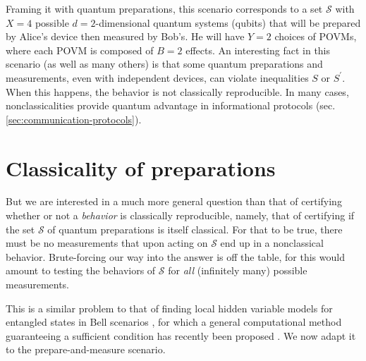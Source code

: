     Framing it with quantum preparations, this scenario corresponds to a set $\mathcal{S}$ with $X=4$ possible $d=2$-dimensional quantum systems (qubits) that will be prepared by Alice's device then measured by Bob's. He will have $Y=2$ choices of POVMs, where each POVM is composed of $B=2$ effects. An interesting fact in this scenario (as well as many others) is that some quantum preparations and measurements, even with independent devices, can violate inequalities $S$ or $S^\prime$. When this happens, the behavior is not classically reproducible. In many cases, nonclassicalities provide quantum advantage in informational protocols (sec. \ref{sec:communication-protocols}). 

    \section{Classicality of preparations}
    \label{sec:preparation-classicality}

        But we are interested in a much more general question than that of certifying whether or not a \emph{behavior} is classically reproducible, namely, that of certifying if the set $\mathcal{S}$ of quantum preparations is itself classical. For that to be true, there must be no measurements that upon acting on $\mathcal{S}$ end up in a nonclassical behavior. Brute-forcing our way into the answer is off the table, for this would amount to testing the behaviors of $\mathcal{S}$ for \emph{all} (infinitely many) possible measurements.

        This is a similar problem to that of finding local hidden variable models for entangled states in Bell scenarios \cite{acin_2006_grothendieck,hirsch_2017_betterlocalhidden}, for which a general computational method guaranteeing a sufficient condition has recently been proposed \cite{cavalcanti_generalmethod_2016,hirsch_algorithmic_2016}. We now adapt it to the prepare-and-measure scenario.

